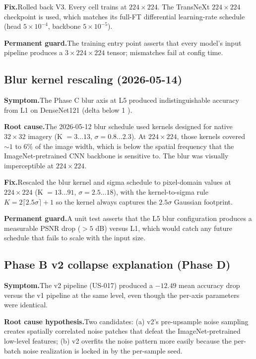 \textbf{Fix.}\quad Rolled back V3. Every cell trains at
$224 \times 224$. The TransNeXt $224 \times 224$ checkpoint is used,
which matches its full-FT differential learning-rate schedule
(head $5 \times 10^{-4}$, backbone $5 \times 10^{-5}$).

\textbf{Permanent guard.}\quad The training entry point asserts that
every model's input pipeline produces a $3 \times 224 \times 224$
tensor; mismatches fail at config time.

\subsection{Blur kernel rescaling (2026-05-14)}
\textbf{Symptom.}\quad The Phase C blur axis at L5 produced
indistinguishable accuracy from L1 on DenseNet121 (delta below 1 \Mpp{}).

\textbf{Root cause.}\quad The 2026-05-12 blur schedule used kernels
designed for native $32 \times 32$ imagery (K $= 3 \ldots 13$,
$\sigma = 0.8 \ldots 2.3$). At $224 \times 224$, those kernels covered
$\sim 1$ to $6 \%$ of the image width, which is below the spatial
frequency that the ImageNet-pretrained CNN backbone is sensitive to.
The blur was visually imperceptible at $224 \times 224$.

\textbf{Fix.}\quad Rescaled the blur kernel and sigma schedule to
pixel-domain values at $224 \times 224$ (K $= 13 \ldots 91$,
$\sigma = 2.5 \ldots 18$), with the kernel-to-sigma rule
$K = 2 \lceil 2.5 \sigma \rceil + 1$ so the kernel always captures the
$2.5 \sigma$ Gaussian footprint.

\textbf{Permanent guard.}\quad A unit test asserts that the L5 blur
configuration produces a measurable PSNR drop ($> 5$ dB) versus L1,
which would catch any future schedule that fails to scale with the
input size.

\subsection{Phase B v2 collapse explanation (Phase D)}
\textbf{Symptom.}\quad The v2 pipeline (US-017) produced a $-12.49$
\Mpp{} mean accuracy drop versus the v1 pipeline at the same level,
even though the per-axis parameters were identical.

\textbf{Root cause hypothesis.}\quad Two candidates: (a) v2's
pre-upsample noise sampling creates spatially correlated noise patches
that defeat the ImageNet-pretrained low-level features; (b) v2
overfits the noise pattern more easily because the per-batch noise
realization is locked in by the per-sample seed.

